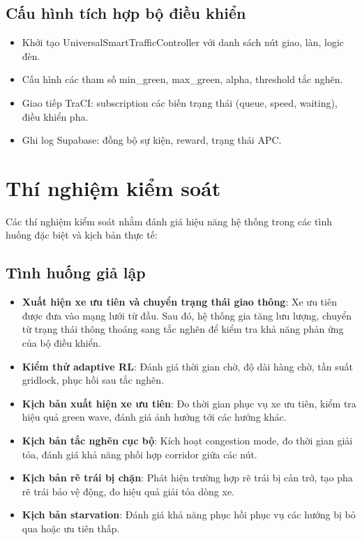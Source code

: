 \subsection{Cấu hình tích hợp bộ điều khiển}

\begin{itemize}
    \item Khởi tạo UniversalSmartTrafficController với danh sách nút giao, làn, logic đèn.
    \item Cấu hình các tham số min\_green, max\_green, alpha, threshold tắc nghẽn.
    \item Giao tiếp TraCI: subscription các biến trạng thái (queue, speed, waiting), điều khiển pha.
    \item Ghi log Supabase: đồng bộ sự kiện, reward, trạng thái APC.
\end{itemize}

\section{Thí nghiệm kiểm soát}

Các thí nghiệm kiểm soát nhằm đánh giá hiệu năng hệ thống trong các tình huống đặc biệt và kịch bản thực tế:

\subsection{Tình huống giả lập}

\begin{itemize}
    \item \textbf{Xuất hiện xe ưu tiên và chuyển trạng thái giao thông}: Xe ưu tiên được đưa vào mạng lưới từ đầu. Sau đó, hệ thống gia tăng lưu lượng, chuyển từ trạng thái thông thoáng sang tắc nghẽn để kiểm tra khả năng phản ứng của bộ điều khiển.
    \item \textbf{Kiểm thử adaptive RL}: Đánh giá thời gian chờ, độ dài hàng chờ, tần suất gridlock, phục hồi sau tắc nghẽn.
    \item \textbf{Kịch bản xuất hiện xe ưu tiên}: Đo thời gian phục vụ xe ưu tiên, kiểm tra hiệu quả green wave, đánh giá ảnh hưởng tới các hướng khác.
    \item \textbf{Kịch bản tắc nghẽn cục bộ}: Kích hoạt congestion mode, đo thời gian giải tỏa, đánh giá khả năng phối hợp corridor giữa các nút.
    \item \textbf{Kịch bản rẽ trái bị chặn}: Phát hiện trường hợp rẽ trái bị cản trở, tạo pha rẽ trái bảo vệ động, đo hiệu quả giải tỏa dòng xe.
    \item \textbf{Kịch bản starvation}: Đánh giá khả năng phục hồi phục vụ các hướng bị bỏ qua hoặc ưu tiên thấp.
\end{itemize}

